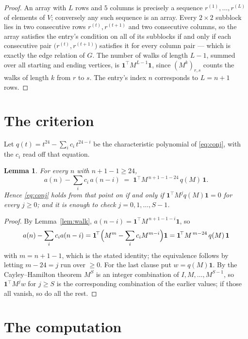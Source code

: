 \documentclass[11pt,a4paper]{article}
\theoremstyle{plain}
\newtheorem{lemma}[theorem]{Lemma}
\theoremstyle{definition}
\begin{document}
\begin{proof}
An array with $L$ rows and $5$ columns is precisely a sequence
$r^{(1)},\dots,r^{(L)}$ of elements of $V$; conversely any such sequence is an array.
Every $2\times2$ subblock lies in two consecutive rows $r^{(t)},r^{(t+1)}$ and two
consecutive columns, so the array satisfies the entry's condition on all of its subblocks
if and only if each consecutive pair $\bigl(r^{(t)},r^{(t+1)}\bigr)$ satisfies it for
every column pair --- which is exactly the edge relation of $G$. The number of walks of
length $L-1$, summed over all starting and ending vertices, is
$\mathbf{1}^{\!\top}M^{L-1}\mathbf{1}$, since $(M^{k})_{r,s}$ counts the walks of
length $k$ from $r$ to $s$. The entry's index $n$ corresponds to $L=n+1$ rows.
\end{proof}

\section{The criterion}

Let $q(t)=t^{24}-\sum_i c_i\,t^{24-i}$ be the characteristic polynomial of
\eqref{eq:conj}, with the $c_i$ read off that equation.

\begin{lemma}\label{lem:crit}
For every $n$ with $n+1-1\ge24$,
\[
a(n)-\sum_i c_i\,a(n-i)\;=\;\mathbf{1}^{\!\top}M^{\,n+1-1-24}\,q(M)\,\mathbf{1} .
\]
Hence \eqref{eq:conj} holds from that point on if and only if
$\mathbf{1}^{\!\top}M^{j}q(M)\mathbf{1}=0$ for every $j\ge0$; and it is enough to check
$j=0,1,\dots,S-1$.
\end{lemma}

\begin{proof}
By Lemma~\ref{lem:walk}, $a(n-i)=\mathbf{1}^{\!\top}M^{\,n+1-1-i}\mathbf{1}$, so
\[
a(n)-\sum_i c_i a(n-i)
=\mathbf{1}^{\!\top}\Bigl(M^{m}-\sum_i c_i M^{m-i}\Bigr)\mathbf{1}
=\mathbf{1}^{\!\top}M^{\,m-24}\,q(M)\,\mathbf{1}
\]
with $m=n+1-1$, which is the stated identity; the equivalence follows by letting
$m-24=j$ run over $\ge0$. For the last clause put $w=q(M)\mathbf{1}$. By the
Cayley--Hamilton theorem $M^{S}$ is an integer combination of $I,M,\dots,M^{S-1}$, so
$\mathbf{1}^{\!\top}M^{j}w$ for $j\ge S$ is the corresponding combination of the earlier
values; if those all vanish, so do all the rest.
\end{proof}

\section{The computation}
\end{document}
